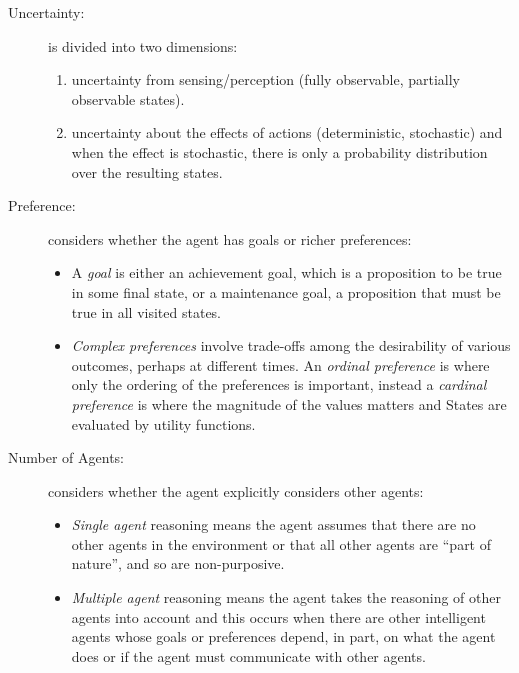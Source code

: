 \begin{description}
    \item [Uncertainty: ] is divided into two dimensions:
                          \begin{enumerate}
                            \item uncertainty from sensing/perception (fully observable, partially observable states).
                            \item uncertainty about the effects of actions (deterministic, stochastic) and 
                            when the effect is stochastic, there is only a probability distribution
                            over the resulting states.
                          \end{enumerate}
    \item [Preference: ] considers whether the agent has goals or richer preferences:
                         \begin{itemize}
                            \item A \emph{goal} is either an achievement goal, which is a proposition to be true
                                  in some final state, or a maintenance goal, a proposition that 
                                  must be true in all visited states.
                            \item \emph{Complex preferences} involve trade-offs among the desirability of
                                  various outcomes, perhaps at different times.\newline
                                  An \emph{ordinal preference} is where only the ordering of the preferences is
                                  important, instead a \emph{cardinal preference} is where the 
                                  magnitude of the values matters and States are evaluated by utility functions.
                         \end{itemize}

    \item [Number of Agents: ] considers whether the agent explicitly considers other agents:
                               \begin{itemize}
                                    \item \emph{Single agent} reasoning means the agent assumes that there are no
                                          other agents in the environment or that all other agents are 
                                          “part of nature”, and so are non-purposive.
                                    \item \emph{Multiple agent} reasoning means the agent
                                          takes the reasoning of other agents into account and this occurs when
                                          there are other intelligent agents whose goals or preferences depend,
                                          in part, on what the agent does or if the agent must communicate
                                          with other agents.
                               \end{itemize}


\end{description}
